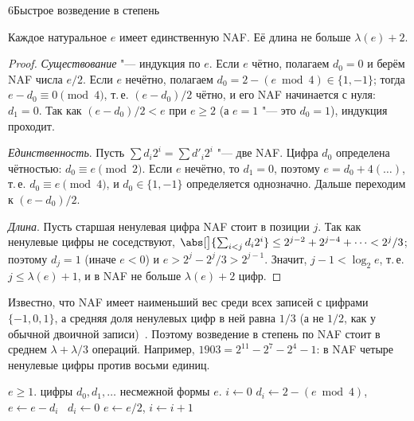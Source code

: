 \begin{lecture}{6}{Быстрое возведение в степень}
\begin{theorem}\label{l6:naf}
Каждое натуральное $e$ имеет единственную NAF. Её длина не больше $\lambda(e) + 2$.
\end{theorem}

\begin{proof}
\emph{Существование} "--- индукция по $e$. Если $e$ чётно, полагаем $d_0 = 0$ и берём NAF числа
$e/2$. Если $e$ нечётно, полагаем $d_0 = 2 - (e \bmod 4) \in \{1, -1\}$; тогда
$e - d_0 \equiv 0 \pmod 4$, т.\,е. $(e - d_0)/2$ чётно, и его NAF начинается с нуля: $d_1 = 0$.
Так как $(e - d_0)/2 < e$ при $e \ge 2$ (а $e = 1$ "--- это $d_0 = 1$), индукция проходит.

\emph{Единственность}. Пусть $\sum d_i 2^i = \sum d'_i 2^i$ "--- две NAF. Цифра $d_0$ определена
чётностью: $d_0 \equiv e \pmod 2$. Если $e$ нечётно, то $d_1 = 0$, поэтому
$e = d_0 + 4(\dots)$, т.\,е. $d_0 \equiv e \pmod 4$, и $d_0 \in \{1, -1\}$ определяется однозначно.
Дальше переходим к $(e - d_0)/2$.

\emph{Длина}. Пусть старшая ненулевая цифра NAF стоит в позиции $j$. Так как ненулевые цифры
не соседствуют, $\abs[\big]{\sum_{i<j} d_i 2^i} \le 2^{j-2} + 2^{j-4} + \cdots < 2^j/3$; поэтому
$d_j = 1$ (иначе $e < 0$) и $e > 2^j - 2^j/3 > 2^{j-1}$. Значит, $j - 1 < \log_2 e$, т.\,е.
$j \le \lambda(e) + 1$, и в NAF не больше $\lambda(e) + 2$ цифр.
\end{proof}

Известно, что NAF имеет наименьший вес среди всех записей с цифрами $\{-1, 0, 1\}$, а средняя доля
ненулевых цифр в ней равна $1/3$ (а не $1/2$, как у обычной двоичной записи)~\cite[гл.~11]{galbraith}.
Поэтому возведение в степень по NAF стоит в среднем $\lambda + \lambda/3$ операций.
Например, $1903 = 2^{11} - 2^7 - 2^4 - 1$: в NAF четыре ненулевые цифры против восьми единиц.

\begin{algorithm}[NAF]
\begin{algorithmic}[1]
\Require $e \ge 1$.
\Ensure цифры $d_0, d_1, \dots$ несмежной формы $e$.
\State $i \gets 0$
   $d_i \gets 2 - (e \bmod 4)$, $e \gets e - d_i$ \Else\ $d_i \gets 0$ \EndIf
  \State $e \gets e/2$, \quad $i \gets i + 1$
\EndWhile
\end{algorithmic}
\end{algorithm}



\end{lecture}
